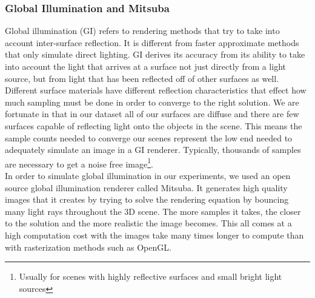 \documentclass[10pt,twocolumn,letterpaper]{article}
\begin{document}

\subsubsection{Global Illumination and Mitsuba}\label{mitsuba_section}
Global illumination (GI) refers to rendering methods that try to take into account inter-surface reflection. It is different from faster approximate methods that only simulate direct lighting.  GI derives its accuracy from its ability to take into account the light that arrives at a surface not just directly from a light source, but from light that has been reflected off of other surfaces as well. Different surface materials have different reflection characteristics that effect how much sampling must be done in order to converge to the right solution.  We are fortunate in that in our dataset all of our surfaces are diffuse and there are few surfaces capable of reflecting light onto the objects in the scene.  This means the sample counts needed to converge our scenes represent the low end needed to adequately simulate an image in a GI renderer. Typically, thousands of samples are necessary to get a noise free image\footnote{Usually for scenes with highly reflective surfaces and small bright light sources}.\\

In order to simulate global illumination in our experiments, we used an open source global illumination renderer called Mitsuba\cite{Mitsuba}.  It generates high quality images that it creates by trying to solve the rendering equation \cite{Kajiya:1984:RTV:800031.808594} by bouncing many light rays throughout the 3D scene.  The more samples it takes, the closer to the solution and the more realistic the image becomes.  This all comes at a high computation cost with the images take many times longer to compute than with rasterization methods such as OpenGL.  
\end{document}
